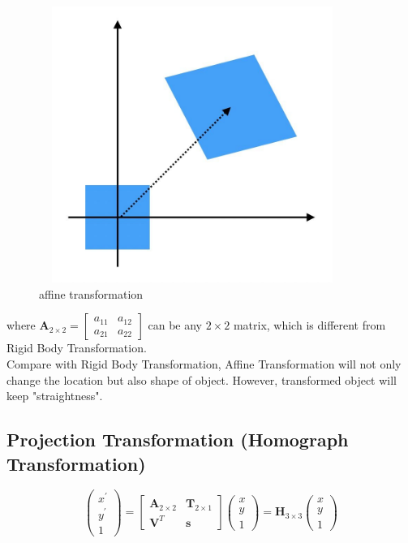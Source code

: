 \documentclass[12pt, a4 paper]{article}
\begin{document}
\begin{figure}[h]
    \centering
    \includegraphics[width=10cm,height=9cm]{affine transformation.jpg}
    \caption{affine transformation}
\end{figure}

\indent where $\boldsymbol{A}_{2\times 2} = 
\begin{bmatrix}
    a_{11} & a_{12} \\
    a_{21} & a_{22}
\end{bmatrix}
$ can be any $2 \times 2 $ matrix, which is different from 
Rigid Body Transformation.\\
\indent Compare with Rigid Body Transformation, Affine Transformation
will not only change the location but also shape of object. However,
transformed object will keep "straightness".

\subsection{Projection Transformation (Homograph Transformation)}
\begin{equation}
    \begin{pmatrix}
        x^{\prime} \\ y^{\prime} \\ 1
    \end{pmatrix} = 
    \begin{bmatrix}
        \boldsymbol{A}_{2 \times 2} & \boldsymbol{T}_{2 \times 1}\\
        \boldsymbol{V}^{T} & \boldsymbol{s}
    \end{bmatrix}
    \begin{pmatrix}
        x \\ y \\ 1
    \end{pmatrix}=
    \boldsymbol{H}_{3\times 3} 
    \begin{pmatrix}
        x \\ y \\ 1
    \end{pmatrix}
\end{equation}
\end{document}

